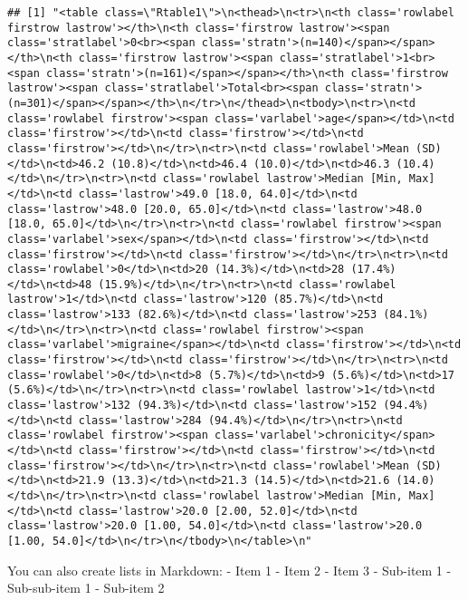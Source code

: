 \documentclass[10pt,letterpaper]{article}
\begin{document}
\begin{verbatim}
## [1] "<table class=\"Rtable1\">\n<thead>\n<tr>\n<th class='rowlabel firstrow lastrow'></th>\n<th class='firstrow lastrow'><span class='stratlabel'>0<br><span class='stratn'>(n=140)</span></span></th>\n<th class='firstrow lastrow'><span class='stratlabel'>1<br><span class='stratn'>(n=161)</span></span></th>\n<th class='firstrow lastrow'><span class='stratlabel'>Total<br><span class='stratn'>(n=301)</span></span></th>\n</tr>\n</thead>\n<tbody>\n<tr>\n<td class='rowlabel firstrow'><span class='varlabel'>age</span></td>\n<td class='firstrow'></td>\n<td class='firstrow'></td>\n<td class='firstrow'></td>\n</tr>\n<tr>\n<td class='rowlabel'>Mean (SD)</td>\n<td>46.2 (10.8)</td>\n<td>46.4 (10.0)</td>\n<td>46.3 (10.4)</td>\n</tr>\n<tr>\n<td class='rowlabel lastrow'>Median [Min, Max]</td>\n<td class='lastrow'>49.0 [18.0, 64.0]</td>\n<td class='lastrow'>48.0 [20.0, 65.0]</td>\n<td class='lastrow'>48.0 [18.0, 65.0]</td>\n</tr>\n<tr>\n<td class='rowlabel firstrow'><span class='varlabel'>sex</span></td>\n<td class='firstrow'></td>\n<td class='firstrow'></td>\n<td class='firstrow'></td>\n</tr>\n<tr>\n<td class='rowlabel'>0</td>\n<td>20 (14.3%)</td>\n<td>28 (17.4%)</td>\n<td>48 (15.9%)</td>\n</tr>\n<tr>\n<td class='rowlabel lastrow'>1</td>\n<td class='lastrow'>120 (85.7%)</td>\n<td class='lastrow'>133 (82.6%)</td>\n<td class='lastrow'>253 (84.1%)</td>\n</tr>\n<tr>\n<td class='rowlabel firstrow'><span class='varlabel'>migraine</span></td>\n<td class='firstrow'></td>\n<td class='firstrow'></td>\n<td class='firstrow'></td>\n</tr>\n<tr>\n<td class='rowlabel'>0</td>\n<td>8 (5.7%)</td>\n<td>9 (5.6%)</td>\n<td>17 (5.6%)</td>\n</tr>\n<tr>\n<td class='rowlabel lastrow'>1</td>\n<td class='lastrow'>132 (94.3%)</td>\n<td class='lastrow'>152 (94.4%)</td>\n<td class='lastrow'>284 (94.4%)</td>\n</tr>\n<tr>\n<td class='rowlabel firstrow'><span class='varlabel'>chronicity</span></td>\n<td class='firstrow'></td>\n<td class='firstrow'></td>\n<td class='firstrow'></td>\n</tr>\n<tr>\n<td class='rowlabel'>Mean (SD)</td>\n<td>21.9 (13.3)</td>\n<td>21.3 (14.5)</td>\n<td>21.6 (14.0)</td>\n</tr>\n<tr>\n<td class='rowlabel lastrow'>Median [Min, Max]</td>\n<td class='lastrow'>20.0 [2.00, 52.0]</td>\n<td class='lastrow'>20.0 [1.00, 54.0]</td>\n<td class='lastrow'>20.0 [1.00, 54.0]</td>\n</tr>\n</tbody>\n</table>\n"
\end{verbatim}

You can also create lists in Markdown: - Item 1 - Item 2 - Item 3 -
Sub-item 1 - Sub-sub-item 1 - Sub-item 2
\end{document}
